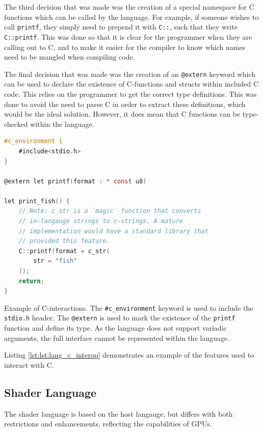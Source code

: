 \documentclass[a4paper,12pt,twoside,openright]{report}
\begin{document}
The third decision that was made was the creation of a special namespace for C
functions which can be called by the language. For example, if someone wishes
to call \texttt{printf}, they simply need to prepend it with \texttt{C::}, such
that they write \texttt{C::printf}. This was done so that it is clear for the
programmer when they are calling out to C, and to make it easier for the
compiler to know which names need to be mangled when compiling code.

The final decision that was made was the creation of an \texttt{@extern}
keyword which can be used to declare the existence of C-functions and structs
within included C code. This relies on the programmer to get the correct type
definitions. This was done to avoid the need to parse C in order to extract
these definitions, which would be the ideal solution. However, it does mean
that C functions can be type-checked within the language.


\begin{lstfloat}
\begin{lstlisting}[language=C]
#c_environment {
    #include<stdio.h>
}

@extern let printf(format : * const u8)

let print_fish() {
    // Note: c_str is a `magic` function that converts
    // in-langauge strings to c-strings. A mature
    // implementation would have a standard library that
    // provided this feature.
    C::printf(format = c_str(
        str = "fish"
    ));
    return;
}
\end{lstlisting}
\label{lst:lang_c_interop}

\caption{Example of C-interactions. The \texttt{\#c\_environment} keyword is
used to include the \texttt{stdio.h} header. The \texttt{@extern} is used to
mark the existence of the \texttt{printf} function and define its type. As the
language does not support variadic arguments, the full interface cannot be
represented within the language.}

\end{lstfloat}

Listing \ref{lst:lst:lang_c_interop} demonstrates an example of the features
used to interact with C.

\subsection{Shader Language}

The shader language is based on the host langauge, but differs with both
restrictions and enhancements, reflecting the capabilities of GPUs.
\end{document}
